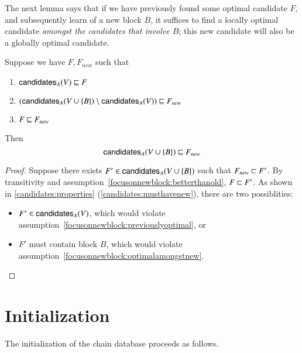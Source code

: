 The next lemma says that if we have previously found some optimal candidate $F$,
and subsequently learn of a new block $B$, it suffices to find a locally optimal
candidate \emph{amongst the candidates that involve $B$}; this new candidate
will also be a globally optimal candidate.

\begin{lemma}
\label{focusonnewblock}
Suppose we have $F, F_\mathit{new}$ such that
\begin{enumerate}
\item \label{focusonnewblock:previouslyoptimal}
$\mathsf{candidates}_A(V) \mathrel{\sqsubseteq} F$
\item \label{focusonnewblock:optimalamongstnew}
$(\mathsf{candidates}_A(V \cup \{B\}) \setminus \mathsf{candidates}_A(V)) \mathrel{\sqsubseteq} F_\mathit{new}$
\item \label{focusonnewblock:betterthanold}
$F \mathrel{\sqsubseteq} F_\mathit{new}$
\end{enumerate}
Then
\begin{equation*}
\mathsf{candidates}_A(V \cup \{B\}) \mathrel{\sqsubseteq} F_\mathit{new}
\end{equation*}
\end{lemma}

\begin{proof}
Suppose there exists $F' \in \mathsf{candidates}_A(V \cup \{B\})$ such that
$F_\mathit{new} \mathrel{\sqsubset} F'$. By transitivity and
assumption~\ref{focusonnewblock:betterthanold}, $F \mathrel{\sqsubset} F'$. As
shown in \cref{candidates:properties} (\cref{candidates:musthavenew}), there are two possiblities:

\begin{itemize}
\item $F' \in \mathsf{candidates}_A(V)$, which would violate
assumption~\cref{focusonnewblock:previouslyoptimal}, or
\item $F'$ must contain block $B$, which would violate
assumption~\cref{focusonnewblock:optimalamongstnew}.
\end{itemize}
\end{proof}

\section{Initialization}
\label{chainsel:init}

The initialization of the chain database proceeds as follows.

